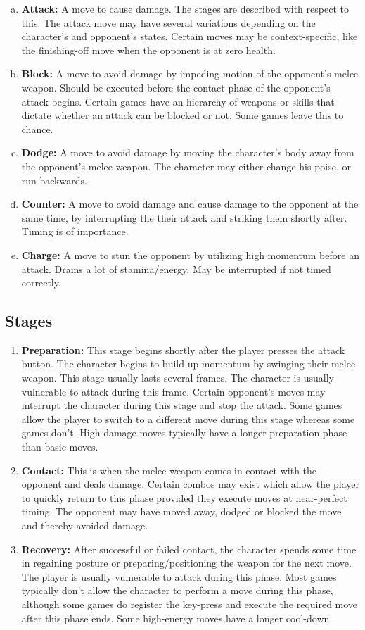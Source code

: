 \documentclass[12pt]{article}
\newcommand{\point}[1]{\item \textbf{#1:}}
\begin{document}
\begin{enumerate}[a)]

\point{Attack} A move to cause damage. The stages are described with respect to this. The attack move may have several variations depending on the character's and opponent's states. Certain moves may be context-specific, like the finishing-off move when the opponent is at zero health.

\point{Block} A move to avoid damage by impeding motion of the opponent's melee weapon. Should be executed before the contact phase of the opponent's attack begins. Certain games have an hierarchy of weapons or skills that dictate whether an attack can be blocked or not. Some games leave this to chance. 

\point{Dodge} A move to avoid damage by moving the character's body away from the opponent's melee weapon. The character may either change his poise, or run backwards. 

\point{Counter} A move to avoid damage and cause damage to the opponent at the same time, by interrupting the their attack and striking them shortly after. Timing is of importance. 

\point{Charge} A move to stun the opponent by utilizing high momentum before an attack. Drains a lot of stamina/energy. May be interrupted if not timed correctly.

\end{enumerate}

\subsection{Stages}

\begin{enumerate}[1)]

\point{Preparation} This stage begins shortly after the player presses the attack button. The character begins to build up momentum by swinging their melee weapon. This stage usually lasts several frames. The character is usually vulnerable to attack during this frame. Certain opponent's moves may interrupt the character during this stage and stop the attack. Some games allow the player to switch to a different move during this stage whereas some games don't. High damage moves typically have a longer preparation phase than basic moves.

\point{Contact} This is when the melee weapon comes in contact with the opponent and deals damage. Certain combos may exist which allow the player to quickly return to this phase provided they execute moves at near-perfect timing. The opponent may have moved away, dodged or blocked the move and thereby avoided damage. 

\point{Recovery} After successful or failed contact, the character spends some time in regaining posture or preparing/positioning the weapon for the next move. The player is usually vulnerable to attack during this phase. Most games typically don't allow the character to perform a move during this phase, although some games do register the key-press and execute the required move after this phase ends. Some high-energy moves have a longer cool-down.

\end{enumerate}
\end{document}
